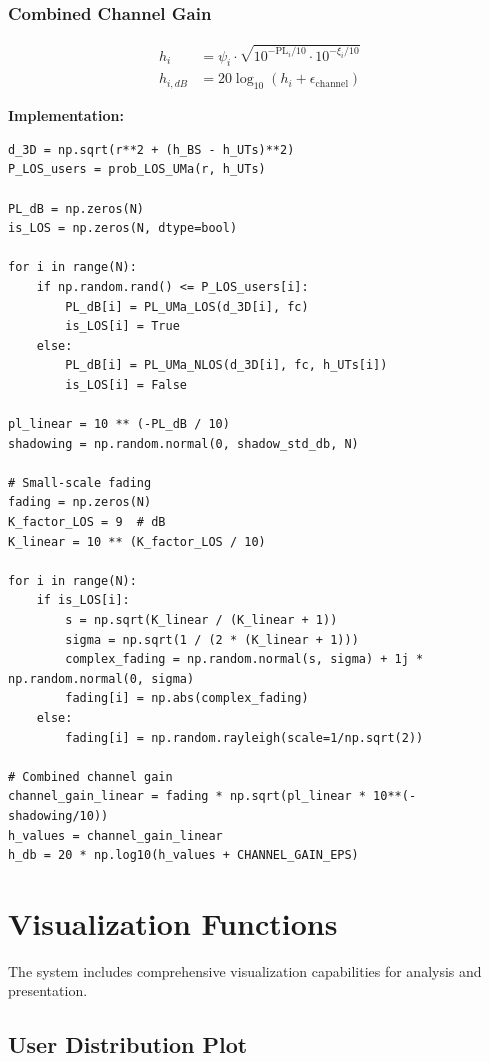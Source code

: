 \documentclass[12pt,a4paper]{article}
\begin{document}
\subsubsection{Combined Channel Gain}

\begin{align}
h_i &= \psi_i \cdot \sqrt{10^{-\text{PL}_i/10} \cdot 10^{-\xi_i/10}} \\
h_{i,dB} &= 20 \log_{10}(h_i + \epsilon_{\text{channel}})
\end{align}

\textbf{Implementation:}
\begin{lstlisting}[caption={Complete Channel Gain Calculation}]
d_3D = np.sqrt(r**2 + (h_BS - h_UTs)**2)
P_LOS_users = prob_LOS_UMa(r, h_UTs)

PL_dB = np.zeros(N)
is_LOS = np.zeros(N, dtype=bool)

for i in range(N):
    if np.random.rand() <= P_LOS_users[i]:
        PL_dB[i] = PL_UMa_LOS(d_3D[i], fc)
        is_LOS[i] = True
    else:
        PL_dB[i] = PL_UMa_NLOS(d_3D[i], fc, h_UTs[i])
        is_LOS[i] = False

pl_linear = 10 ** (-PL_dB / 10)
shadowing = np.random.normal(0, shadow_std_db, N)

# Small-scale fading
fading = np.zeros(N)
K_factor_LOS = 9  # dB
K_linear = 10 ** (K_factor_LOS / 10)

for i in range(N):
    if is_LOS[i]:
        s = np.sqrt(K_linear / (K_linear + 1))
        sigma = np.sqrt(1 / (2 * (K_linear + 1)))
        complex_fading = np.random.normal(s, sigma) + 1j * np.random.normal(0, sigma)
        fading[i] = np.abs(complex_fading)
    else:
        fading[i] = np.random.rayleigh(scale=1/np.sqrt(2))

# Combined channel gain
channel_gain_linear = fading * np.sqrt(pl_linear * 10**(-shadowing/10))
h_values = channel_gain_linear
h_db = 20 * np.log10(h_values + CHANNEL_GAIN_EPS)
\end{lstlisting}

\section{Visualization Functions}

The system includes comprehensive visualization capabilities for analysis and presentation.

\subsection{User Distribution Plot}
\end{document}
